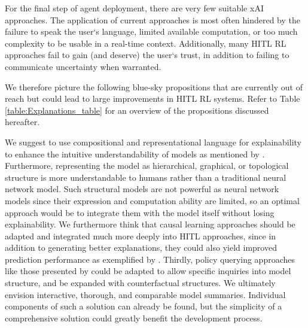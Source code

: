 \documentclass[twoside,11pt]{article}
\begin{document}
\begin{enumerate}
For the final step of agent deployment, there are very few suitable xAI approaches. The application of current approaches is most often hindered by the failure to speak the user`s language, limited available computation, or too much complexity to be usable in a real-time context. Additionally, many HITL RL approaches fail to gain (and deserve) the user`s trust, in addition to failing to communicate uncertainty when warranted.

We therefore picture the following blue-sky propositions that are currently out of reach but could lead to large improvements in HITL RL systems. Refer to Table \ref{table:Explanations_table} for an overview of the propositions discussed hereafter.


We suggest to use compositional and representational language for explainability to enhance the intuitive understandability of models as mentioned by \citet{RoyEtAl:2021:RLRoboticsChallenges}.
Furthermore, representing the model as hierarchical, graphical, or topological structure \citep{lyu2019sdrl,battaglia2018relational} is more understandable to humans rather than a traditional neural network model. Such structural models are not powerful as neural network models since their expression and computation ability are limited, so an optimal approach would be to integrate them with the model itself without losing explainability.
We furthermore think that causal learning approaches should be adapted and integrated much more deeply into HITL approaches, since in addition to generating better explanations, they could also yield improved prediction performance as exemplified by \citet{MadumalEtAl:2020:CausalRLCFs}. Thirdly, policy querying approaches like those presented by \citet{HayesShah:2017:AutonomousPolicyExplanation} could be adapted to allow specific inquiries into model structure, and be expanded with counterfactual structures.
We ultimately envision interactive, thorough, and comparable model summaries. Individual components of such a solution can already be found, but the simplicity of a comprehensive solution could greatly benefit the development process.




\end{enumerate}
\end{document}
